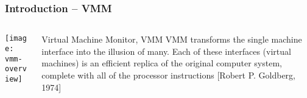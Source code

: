 \begin{frame}%
	\frametitle{Introduction -- VMM}
	
	
	
	\begin{columns}
		
		\begin{column}{.5\textwidth}
			
			\texttt{[image: vmm-overview]}
			
		\end{column}
		
		\begin{column}{.5\textwidth}
			
			\begin{block}{Virtual Machine Monitor, VMM}
	VMM transforms the single machine interface into the illusion of many. Each of these interfaces (virtual machines) is an {\color{blue}efficient replica of the original computer system}, complete with all of the processor instructions [Robert P. Goldberg, 1974]
			\end{block}
			
		\end{column}
		
		
	\end{columns}
	
	
\end{frame}

